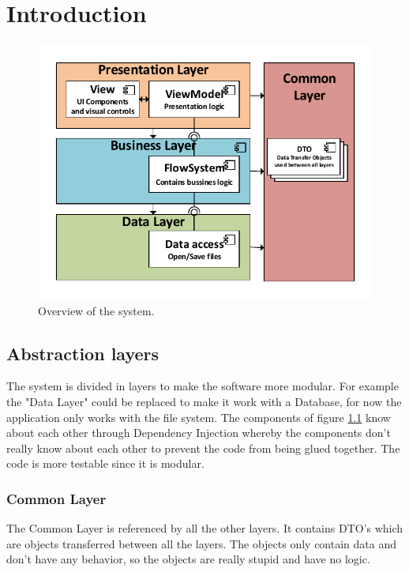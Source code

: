 \chapter{Introduction}
\begin{figure}[h!]
  \centering
    \includegraphics[scale=0.8]{figures/SystemOverview.pdf}
  \caption{Overview of the system.}
  \label{fig:systemoverview}
\end{figure}

\section{Abstraction layers}
The system is divided in layers to make the software more modular. For example the "Data Layer" could be replaced to make it work with a Database, for now the application only works with the file system. The components of figure \ref{fig:systemoverview} know about each other through Dependency Injection whereby the components don't really know about each other to prevent the code from being glued together. The code is more testable since it is modular.

\subsection{Common Layer}
The Common Layer is referenced by all the other layers. It contains DTO's which are objects transferred between all the layers. The objects only contain data and don't have any behavior, so the objects are really stupid and have no logic.


